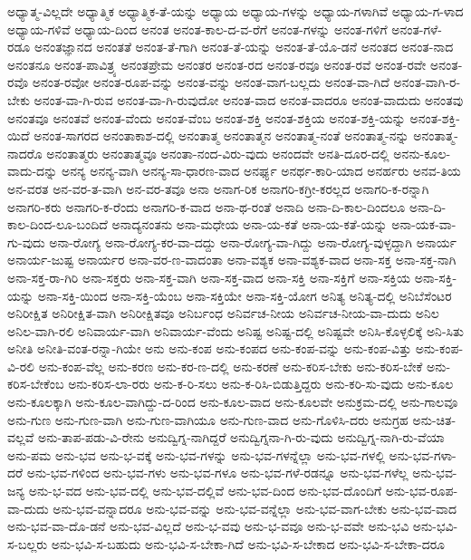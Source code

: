 {ಅಧ್ಯಾತ್ಮ-ವಿಲ್ಲದೇ
ಅಧ್ಯಾತ್ಮಿಕ
ಅಧ್ಯಾತ್ಮಿಕ-ತೆ-ಯನ್ನು
ಅಧ್ಯಾಯ
ಅಧ್ಯಾಯ-ಗಳನ್ನು
ಅಧ್ಯಾಯ-ಗಳಾಗಿವೆ
ಅಧ್ಯಾಯ-ಗ-ಳಾದ
ಅಧ್ಯಾಯ-ಗಳಿವೆ
ಅಧ್ಯಾಯ-ದಿಂದ
ಅನಂತ
ಅನಂತ-ಕಾಲ-ದ-ವ-ರೆಗೆ
ಅನಂತ-ಗಳನ್ನು
ಅನಂತ-ಗಳಿಗೆ
ಅನಂತ-ಗಳೆ-ರಡೂ
ಅನಂತಜ್ಞಾನದ
ಅನಂತತೆ
ಅನಂತ-ತೆ-ಗಾಗಿ
ಅನಂತ-ತೆ-ಯನ್ನು
ಅನಂತ-ತೆ-ಯೊ-ಡನೆ
ಅನಂತದ
ಅನಂತ-ನಾದ
ಅನಂತನೂ
ಅನಂತ-ಪಾವಿತ್ರ್ಯ
ಅನಂತಪ್ರೇಮ
ಅನಂತರ
ಅನಂತ-ರದ
ಅನಂತ-ರವೂ
ಅನಂತ-ರವೆ
ಅನಂತ-ರವೇ
ಅನಂತ-ರವೊ
ಅನಂತ-ರವೋ
ಅನಂತ-ರೂಪ-ವನ್ನು
ಅನಂತ-ವನ್ನು
ಅನಂತ-ವಾಗ-ಬಲ್ಲದು
ಅನಂತ-ವಾ-ಗಿದೆ
ಅನಂತ-ವಾಗಿ-ರ-ಬೇಕು
ಅನಂತ-ವಾ-ಗಿ-ರುವ
ಅನಂತ-ವಾ-ಗಿ-ರುವುದೋ
ಅನಂತ-ವಾದ
ಅನಂತ-ವಾದರೂ
ಅನಂತ-ವಾದುದು
ಅನಂತವು
ಅನಂತವೂ
ಅನಂತವೆ
ಅನಂತ-ವೆಂದು
ಅನಂತ-ವೆಂಬ
ಅನಂತ-ಶಕ್ತಿ
ಅನಂತ-ಶಕ್ತಿಯ
ಅನಂತ-ಶಕ್ತಿ-ಯನ್ನು
ಅನಂತ-ಶಕ್ತಿ-ಯಿದೆ
ಅನಂತ-ಸಾಗರದ
ಅನಂತಾಕಾಶ-ದಲ್ಲಿ
ಅನಂತಾತ್ಮ
ಅನಂತಾತ್ಮನ
ಅನಂತಾತ್ಮ-ನಂತೆ
ಅನಂತಾತ್ಮ-ನನ್ನು
ಅನಂತಾತ್ಮ-ನಾದರೊ
ಅನಂತಾತ್ಮರು
ಅನಂತಾತ್ಮವೂ
ಅನಂತಾ-ನಂದ-ವಿರು-ವುದು
ಅನಂದವೇ
ಅನತಿ-ದೂರ-ದಲ್ಲಿ
ಅನನು-ಕೂಲ-ವಾದು-ದನ್ನು
ಅನನ್ಯ
ಅನನ್ಯ-ವಾಗಿ
ಅನನ್ಯ-ಸಾ-ಧಾರಣ-ವಾದ
ಅನರ್ಘ್ಯ
ಅನರ್ಥ-ಕಾರಿ-ಯಾದ
ಅನರ್ಹರು
ಅನವ-ತಿಯ
ಅನ-ವರತ
ಅನ-ವರ-ತ-ವಾಗಿ
ಅನ-ವರ-ತವೂ
ಅನಾ
ಅನಾಗ-ರಿಕ
ಅನಾಗರಿ-ಕಗ್ರೀ-ಕರಲ್ಲದ
ಅನಾಗರಿ-ಕ-ರನ್ನಾಗಿ
ಅನಾಗರಿ-ಕರು
ಅನಾಗರಿ-ಕ-ರೆಂದು
ಅನಾಗರಿ-ಕ-ವಾದ
ಅನಾ-ಥ-ರಂತೆ
ಅನಾದಿ
ಅನಾ-ದಿ-ಕಾಲ-ದಿಂದಲೂ
ಅನಾ-ದಿ-ಕಾಲ-ದಿಂದ-ಲೂ-ಬಂದಿದೆ
ಅನಾದ್ಯನಂತನು
ಅನಾ-ಮಧೇಯ
ಅನಾ-ಯ-ಕತೆ
ಅನಾ-ಯ-ಕತೆ-ಯನ್ನು
ಅನಾ-ಯಕ-ವಾ-ಗು-ವುದು
ಅನಾ-ರೋಗ್ಯ
ಅನಾ-ರೋಗ್ಯ-ಕರ-ವಾ-ದದ್ದು
ಅನಾ-ರೋಗ್ಯ-ವಾ-ಗಿದ್ದು
ಅನಾ-ರೋಗ್ಯ-ವುಳ್ಳದ್ದಾಗಿ
ಅನಾರ್ಯ
ಅನಾರ್ಯ-ಜುಷ್ಟ
ಅನಾರ್ಯರ
ಅನಾ-ವರ-ಣ-ವಾದಂತಾ
ಅನಾ-ವಶ್ಯಕ
ಅನಾ-ವಶ್ಯಕ-ವಾದ
ಅನಾ-ಸಕ್ತ
ಅನಾ-ಸಕ್ತ-ನಾಗಿ
ಅನಾ-ಸಕ್ತ-ರಾ-ಗಿರಿ
ಅನಾ-ಸಕ್ತರು
ಅನಾ-ಸಕ್ತ-ವಾಗಿ
ಅನಾ-ಸಕ್ತ-ವಾದ
ಅನಾ-ಸಕ್ತಿ
ಅನಾ-ಸಕ್ತಿಗೆ
ಅನಾ-ಸಕ್ತಿಯ
ಅನಾ-ಸಕ್ತಿ-ಯನ್ನು
ಅನಾ-ಸಕ್ತಿ-ಯಿಂದ
ಅನಾ-ಸಕ್ತಿ-ಯೆಂಬ
ಅನಾ-ಸಕ್ತಿಯೇ
ಅನಾ-ಸಕ್ತಿ-ಯೋಗ
ಅನಿತ್ಯ
ಅನಿತ್ಯ-ದಲ್ಲಿ
ಅನಿಬೆಸೆಂಟರ
ಅನಿರೀಕ್ಷಿತ
ಅನಿರೀಕ್ಷಿತ-ವಾಗಿ
ಅನಿರೀಕ್ಷಿತವೂ
ಅನಿರ್ಬಂಧ
ಅನಿರ್ವಚ-ನೀಯ
ಅನಿರ್ವಚ-ನೀಯ-ವಾ-ದುದು
ಅನಿಲ
ಅನಿಲ-ವಾಗಿ-ರಲಿ
ಅನಿವಾರ್ಯ-ವಾಗಿ
ಅನಿವಾರ್ಯ-ವೆಂದು
ಅನಿಷ್ಟ
ಅನಿಷ್ಟ-ದಲ್ಲಿ
ಅನಿಷ್ಟವೇ
ಅನಿಸಿ-ಕೊಳ್ಳಲಿಕ್ಕೆ
ಅನಿ-ಸಿತು
ಅನೀತಿ
ಅನೀತಿ-ವಂತ-ರನ್ನಾ-ಗಿಯೇ
ಅನು
ಅನು-ಕಂಪ
ಅನು-ಕಂಪದ
ಅನು-ಕಂಪ-ವನ್ನು
ಅನು-ಕಂಪ-ವಿತ್ತು
ಅನು-ಕಂಪ-ವಿ-ರಲಿ
ಅನು-ಕಂಪ-ವೆಲ್ಲ
ಅನು-ಕರಣ
ಅನು-ಕರ-ಣ-ದಲ್ಲಿ
ಅನು-ಕರಣೆ
ಅನು-ಕರಿಸ-ಬೇಕು
ಅನು-ಕರಿಸ-ಬೇಕೆ
ಅನು-ಕರಿಸ-ಬೇಕೆಂಬ
ಅನು-ಕರಿಸ-ಲಾ-ರರು
ಅನು-ಕ-ರಿ-ಸಲು
ಅನು-ಕ-ರಿಸಿ-ಬಿಡುತ್ತಿದ್ದರು
ಅನು-ಕರಿ-ಸು-ವುದು
ಅನು-ಕೂಲ
ಅನು-ಕೂಲಕ್ಕಾಗಿ
ಅನು-ಕೂಲ-ವಾಗಿದ್ದು-ದ-ರಿಂದ
ಅನು-ಕೂಲ-ವಾದ
ಅನು-ಕೂಲವೇ
ಅನುಕ್ರಮ-ದಲ್ಲಿ
ಅನು-ಗಾಲವೂ
ಅನು-ಗುಣ
ಅನು-ಗುಣ-ವಾಗಿ
ಅನು-ಗುಣ-ವಾಗಿಯೂ
ಅನು-ಗುಣ-ವಾದ
ಅನು-ಗೊಳಿಸಿ-ದರು
ಅನುಗ್ರಹ
ಅನು-ಚಿತ-ವಲ್ಲವೆ
ಅನು-ತಾಪ-ಪಡು-ವಿ-ರೇನು
ಅನುದ್ವಿಗ್ನ-ನಾಗಿದ್ದರೆ
ಅನುದ್ವಿಗ್ನನಾ-ಗಿ-ರು-ವುದು
ಅನುದ್ವಿಗ್ನ-ನಾಗಿ-ರು-ವೆಯಾ
ಅನು-ಪಮ
ಅನು-ಭವ
ಅನು-ಭ-ವಕ್ಕೆ
ಅನು-ಭವ-ಗಳನ್ನು
ಅನು-ಭವ-ಗಳನ್ನೆಲ್ಲಾ
ಅನು-ಭವ-ಗಳಲ್ಲಿ
ಅನು-ಭವ-ಗಳಾ-ದರೆ
ಅನು-ಭವ-ಗಳಿಂದ
ಅನು-ಭವ-ಗಳು
ಅನು-ಭವ-ಗಳೂ
ಅನು-ಭವ-ಗಳೆ-ರಡನ್ನೂ
ಅನು-ಭವ-ಗಳೆಲ್ಲ
ಅನು-ಭವ-ಜನ್ಯ
ಅನು-ಭ-ವದ
ಅನು-ಭವ-ದಲ್ಲಿ
ಅನು-ಭವ-ದಲ್ಲಿವೆ
ಅನು-ಭವ-ದಿಂದ
ಅನು-ಭವ-ದೊಂದಿಗೆ
ಅನು-ಭವ-ರೂಪ-ವಾ-ದುದು
ಅನು-ಭವ-ವನ್ನಾದರೂ
ಅನು-ಭವ-ವನ್ನು
ಅನು-ಭವ-ವನ್ನೆಲ್ಲಾ
ಅನು-ಭವ-ವಾಗ-ಬೇಕು
ಅನು-ಭವ-ವಾದ
ಅನು-ಭವ-ವಾ-ದೊ-ಡನೆ
ಅನು-ಭವ-ವಿಲ್ಲದೆ
ಅನು-ಭ-ವವು
ಅನು-ಭ-ವವೂ
ಅನು-ಭ-ವವೇ
ಅನು-ಭವಿ
ಅನು-ಭವಿ-ಸ-ಬಲ್ಲರು
ಅನು-ಭವಿ-ಸ-ಬಹುದು
ಅನು-ಭವಿ-ಸ-ಬೇಕಾ-ಗಿದೆ
ಅನು-ಭವಿ-ಸ-ಬೇಕಾದ
ಅನು-ಭವಿ-ಸ-ಬೇಕಾ-ದರೂ
}
